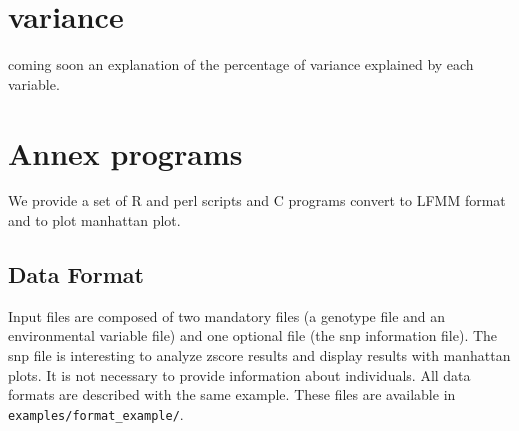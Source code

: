 \documentclass[10pt,a4paper]{article}
\begin{document}
\section{variance}
coming soon an explanation of the percentage of variance explained by each variable.

\section{Annex programs}

We provide a set of R and perl scripts and C programs convert to LFMM format and to plot manhattan plot.

\subsection{Data Format}
Input files are composed of two mandatory files (a genotype file and an environmental variable file)
and one optional file (the snp information file). The snp file is interesting to analyze zscore
results and display results with manhattan plots.
It is not necessary to provide information about individuals.
All data formats are described with the same
example. These files are available in \verb|examples/format_example/|.
\end{document}
